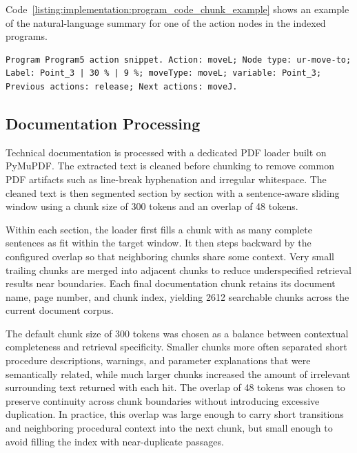 Code~\ref{listing:implementation:program_code_chunk_example} shows an example of the natural-language summary for one of the action nodes in the indexed programs.

\begin{listing}[H]
	\begin{verbatim}
Program Program5 action snippet. Action: moveL; Node type: ur-move-to; Label: Point_3 | 30 % | 9 %; moveType: moveL; variable: Point_3; Previous actions: release; Next actions: moveJ.
	\end{verbatim}
	\caption{Example of a code-level chunk summary.}
	\label{listing:implementation:program_code_chunk_example}
\end{listing}

\subsection{Documentation Processing}
Technical documentation is processed with a dedicated PDF loader built on PyMuPDF. The extracted text is cleaned before chunking to remove common PDF artifacts such as line-break hyphenation and irregular whitespace. The cleaned text is then segmented section by section with a sentence-aware sliding window using a chunk size of 300 tokens and an overlap of 48 tokens.

Within each section, the loader first fills a chunk with as many complete sentences as fit within the target window. It then steps backward by the configured overlap so that neighboring chunks share some context. Very small trailing chunks are merged into adjacent chunks to reduce underspecified retrieval results near boundaries. Each final documentation chunk retains its document name, page number, and chunk index, yielding 2612 searchable chunks across the current document corpus.

The default chunk size of 300 tokens was chosen as a balance between contextual completeness and retrieval specificity. Smaller chunks more often separated short procedure descriptions, warnings, and parameter explanations that were semantically related, while much larger chunks increased the amount of irrelevant surrounding text returned with each hit. The overlap of 48 tokens was chosen to preserve continuity across chunk boundaries without introducing excessive duplication. In practice, this overlap was large enough to carry short transitions and neighboring procedural context into the next chunk, but small enough to avoid filling the index with near-duplicate passages.


